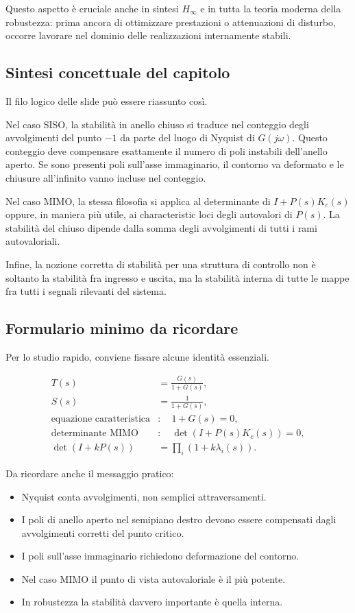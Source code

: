 \documentclass[11pt,a4paper]{article}
\begin{document}
Questo aspetto è cruciale anche in sintesi $H_\infty$ e in tutta la teoria moderna della robustezza: prima ancora di ottimizzare prestazioni o attenuazioni di disturbo, occorre lavorare nel dominio delle realizzazioni internamente stabili.

\subsection{Sintesi concettuale del capitolo}

Il filo logico delle slide può essere riassunto così.

Nel caso SISO, la stabilità in anello chiuso si traduce nel conteggio degli avvolgimenti del punto $-1$ da parte del luogo di Nyquist di $G(j\omega)$. Questo conteggio deve compensare esattamente il numero di poli instabili dell’anello aperto. Se sono presenti poli sull’asse immaginario, il contorno va deformato e le chiusure all’infinito vanno incluse nel conteggio.

Nel caso MIMO, la stessa filosofia si applica al determinante di $I+P(s)K_c(s)$ oppure, in maniera più utile, ai characteristic loci degli autovalori di $P(s)$. La stabilità del chiuso dipende dalla somma degli avvolgimenti di tutti i rami autovaloriali.

Infine, la nozione corretta di stabilità per una struttura di controllo non è soltanto la stabilità fra ingresso e uscita, ma la stabilità interna di tutte le mappe fra tutti i segnali rilevanti del sistema.

\subsection{Formulario minimo da ricordare}

Per lo studio rapido, conviene fissare alcune identità essenziali.

\begin{align*}
T(s) &= \frac{G(s)}{1+G(s)}, \\
S(s) &= \frac{1}{1+G(s)}, \\
\text{equazione caratteristica} &:\quad 1+G(s)=0, \\
\text{determinante MIMO} &:\quad \det(I+P(s)K_c(s))=0, \\
\det(I+kP(s)) &= \prod_i (1+k\lambda_i(s)).
\end{align*}

Da ricordare anche il messaggio pratico:
\begin{itemize}
    \item Nyquist conta avvolgimenti, non semplici attraversamenti.
    \item I poli di anello aperto nel semipiano destro devono essere compensati dagli avvolgimenti corretti del punto critico.
    \item I poli sull’asse immaginario richiedono deformazione del contorno.
    \item Nel caso MIMO il punto di vista autovaloriale è il più potente.
    \item In robustezza la stabilità davvero importante è quella interna.
\end{itemize}
\end{document}
